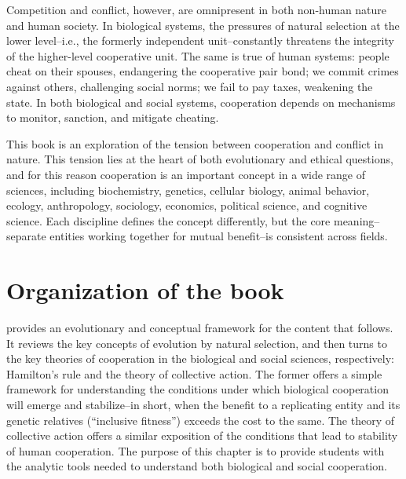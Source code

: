 \documentclass{tufte-book} %
\begin{document}
Competition and conflict, however, are omnipresent in both non-human nature and human society. In biological systems, the pressures of natural selection at the lower level--i.e., the formerly independent unit--constantly threatens the integrity of the higher-level cooperative unit. The same is true of human systems: people cheat on their spouses, endangering the cooperative pair bond; we commit crimes against others, challenging social norms; we fail to pay taxes, weakening the state. In both biological and social systems, cooperation depends on mechanisms to monitor, sanction, and mitigate cheating. 

This book is an exploration of the tension between cooperation and conflict in nature. This tension lies at the heart of both evolutionary and ethical questions, and for this reason cooperation is an important concept in a wide range of sciences, including biochemistry, genetics, cellular biology, animal behavior, ecology, anthropology, sociology, economics, political science, and cognitive science. Each discipline defines the concept differently, but the core meaning--separate entities working together for mutual benefit--is consistent across fields. 

\section{Organization of the book}

 provides an evolutionary and conceptual framework for the content that follows. It reviews the key concepts of evolution by natural selection, and then turns to the key theories of cooperation in the biological and social sciences, respectively: Hamilton's rule and the theory of collective action. The former offers a simple framework for understanding the conditions under which biological cooperation will emerge and stabilize--in short, when the benefit to a replicating entity and its genetic relatives (``inclusive fitness'') exceeds the cost to the same. The theory of collective action offers a similar exposition of the conditions that lead to stability of human cooperation. The purpose of this chapter is  to provide students with the analytic tools needed to understand both biological and social cooperation.
\end{document}
